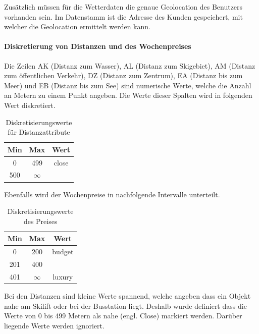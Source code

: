 Zusätzlich müssen für die Wetterdaten die genaue Geolocation des Benutzers vorhanden sein. Im Datenstamm ist die Adresse des Kunden gespeichert, mit welcher die Geolocation ermittelt werden kann.

\paragraph{Diskretierung von Distanzen und des Wochenpreises} Die Zeilen AK (Distanz zum Wasser), AL (Distanz zum Skigebiet), AM (Distanz zum öffentlichen Verkehr), DZ (Distanz zum Zentrum), EA (Distanz bis zum Meer) und EB (Distanz bis zum See) sind numerische Werte, welche die Anzahl an Metern zu einem Punkt angeben. Die Werte dieser Spalten wird in folgenden Wert diskretiert. 

\begin{table}[h] 
	\caption{Diskretisierungswerte für Distanzattribute}
	\centering
	\label{fig:recherche:datenvorbereitung:1}
	\begin{tabular}{ | c | c | c | } 
		\hline 
		\rowcolor{tableheadcolor}
		\bfseries Min & \bfseries Max & \bfseries Wert \\ \hline 
		0 & 499 & close \\ \hline 
		500 & $\infty$ &   \\ \hline 
	\end{tabular}
\end{table}

Ebenfalls wird der Wochenpreise in nachfolgende Intervalle unterteilt.
\begin{table}[h] 
	\caption{Diskretisierungswerte des Preises}
	\centering
	\label{fig:recherche:datenvorbereitung:2}
	\begin{tabular}{ | c | c | c | } 
		\hline 
		\rowcolor{tableheadcolor}
		\bfseries Min & \bfseries Max & \bfseries Wert \\ \hline 
		0 & 200 & budget \\ \hline 
		201 & 400 &  \\ \hline 
		401 & $\infty$ & luxury \\ \hline 
	\end{tabular}
\end{table}

Bei den Distanzen sind kleine Werte spannend, welche angeben dass ein Objekt nahe am Skilift oder bei der Busstation liegt. Deshalb wurde definiert dass die Werte von 0 bis 499 Metern als nahe (engl. Close) markiert werden. Darüber liegende Werte werden ignoriert.

